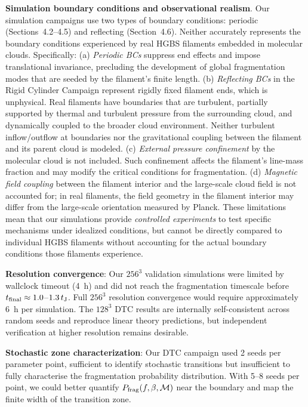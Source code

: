 \documentclass[twoside,twocolumn]{mnras}
\begin{document}
\textbf{Simulation boundary conditions and observational realism}. Our simulation campaigns use two types of boundary conditions: periodic (Sections~4.2--4.5) and reflecting (Section~4.6). Neither accurately represents the boundary conditions experienced by real HGBS filaments embedded in molecular clouds. Specifically: (a) \textit{Periodic BCs} suppress end effects and impose translational invariance, precluding the development of global fragmentation modes that are seeded by the filament's finite length. (b) \textit{Reflecting BCs} in the Rigid Cylinder Campaign represent rigidly fixed filament ends, which is unphysical. Real filaments have boundaries that are turbulent, partially supported by thermal and turbulent pressure from the surrounding cloud, and dynamically coupled to the broader cloud environment. Neither turbulent inflow/outflow at boundaries nor the gravitational coupling between the filament and its parent cloud is modeled. (c) \textit{External pressure confinement} by the molecular cloud is not included. Such confinement affects the filament's line-mass fraction and may modify the critical conditions for fragmentation. (d) \textit{Magnetic field coupling} between the filament interior and the large-scale cloud field is not accounted for; in real filaments, the field geometry in the filament interior may differ from the large-scale orientation measured by Planck. These limitations mean that our simulations provide \textit{controlled experiments} to test specific mechanisms under idealized conditions, but cannot be directly compared to individual HGBS filaments without accounting for the actual boundary conditions those filaments experience.

\textbf{Resolution convergence}: Our $256^3$ validation simulations were limited by wallclock timeout (4~h) and did not reach the fragmentation timescale before $t_{\rm final} \approx 1.0$--$1.3\,t_{\rm J}$. Full $256^3$ resolution convergence would require approximately 6~h per simulation. The $128^3$ DTC results are internally self-consistent across random seeds and reproduce linear theory predictions, but independent verification at higher resolution remains desirable.

\textbf{Stochastic zone characterization}: Our DTC campaign used 2 seeds per parameter point, sufficient to identify stochastic transitions but insufficient to fully characterise the fragmentation probability distribution. With 5--8 seeds per point, we could better quantify $P_{\rm frag}(f, \beta, \mathcal{M})$ near the boundary and map the finite width of the transition zone.
\end{document}
